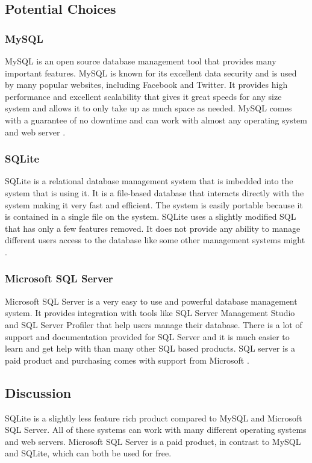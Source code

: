 \documentclass[onecolumn, draftclsnofoot,10pt, compsoc]{IEEEtran}
\begin{document}
\subsection{Potential Choices}

\subsubsection{MySQL}
MySQL is an open source database management tool that provides many important features. MySQL is known for its excellent data security and is used by many popular websites, including Facebook and Twitter. It provides high performance and excellent scalability that gives it great speeds for any size system and allows it to only take up as much space as needed. MySQL comes with a guarantee of no downtime and can work with almost any operating system and web server \cite{mysql}.

\subsubsection{SQLite}
SQLite is a relational database management system that is imbedded into the system that is using it. It is a file-based database that interacts directly with the system making it very fast and efficient. The system is easily portable because it is contained in a single file on the system. SQLite uses a slightly modified SQL that has only a few features removed. It does not provide any ability to manage different users access to the database like some other management systems might \cite{sqlite}.

\subsubsection{Microsoft SQL Server}
Microsoft SQL Server is a very easy to use and powerful database management system. It provides integration with tools like SQL Server Management Studio and SQL Server Profiler that help users manage their database. There is a lot of support and documentation provided for SQL Server and it is much easier to learn and get help with than many other SQL based products. SQL server is a paid product and purchasing comes with support from Microsoft \cite{sqlserver}.

\subsection{Discussion}
SQLite is a slightly less feature rich product compared to MySQL and Microsoft SQL Server. All of these systems can work with many different operating systems and web servers. Microsoft SQL Server is a paid product, in contrast to MySQL and SQLite, which can both be used for free.
\end{document}
